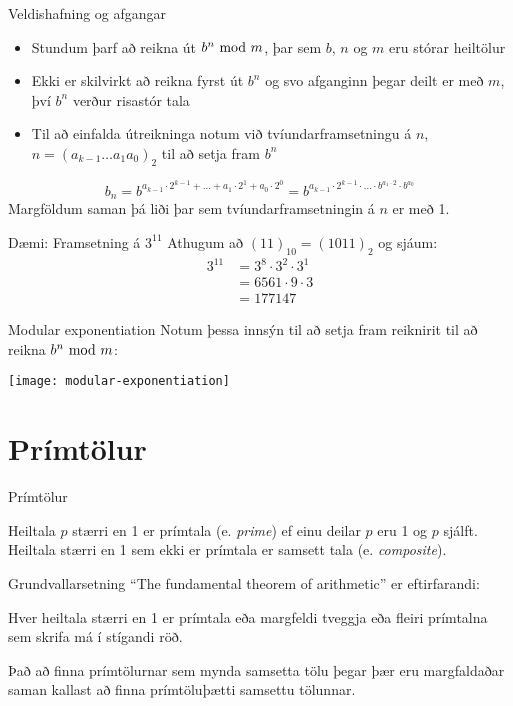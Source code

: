 \documentclass{beamer}
\begin{document}
\begin{frame}{Veldishafning og afgangar}
\begin{itemize}
 \item Stundum þarf að reikna út $b^n \ \text{mod}\ m$, þar sem $b$, $n$ og $m$ eru stórar heiltölur
 \item Ekki er skilvirkt að reikna fyrst út $b^n$ og svo afganginn þegar deilt er með $m$, því $b^n$ verður risastór tala
 \item Til að einfalda útreikninga notum við tvíundarframsetningu á $n$, $n = (a_{k-1}\ldots a_1 a_0)_2$ til að setja fram $b^n$
\end{itemize}
\[
 b_n = b^{a_{k-1}\cdot 2^{k-1} + \ldots + a_1\cdot 2^1 + a_0 \cdot 2^0} = b^{a_{k-1}\cdot2^{k-1}\cdot \ldots \cdot b^{a_1\cdot 2} \cdot b^{a_0}}
\]
Margföldum saman þá liði þar sem tvíundarframsetningin á $n$ er með 1.
\end{frame}

\begin{frame}{Dæmi: Framsetning á $3^{11}$}
Athugum að $(11)_{10} = (1011)_2$ og sjáum:
\begin{align*}
3^{11} &= 3^8\cdot 3^2 \cdot 3^1\\
&=6561 \cdot 9 \cdot 3\\
&=177147
\end{align*}

\end{frame}

\begin{frame}{Modular exponentiation}
Notum þessa innsýn til að setja fram reiknirit til að reikna $b^n \ \text{mod}\ m$:
\begin{center}
\texttt{[image: modular-exponentiation]}
\end{center}
\end{frame}

\section{Prímtölur}

\begin{frame}{Prímtölur}
\begin{tcolorbox}[title=Prímtölur]
Heiltala $p$ stærri en 1 er prímtala (e. \emph{prime}) ef einu deilar $p$ eru 1 og $p$ sjálft. Heiltala stærri en 1 sem ekki er prímtala er samsett tala (e. \emph{composite}).
\end{tcolorbox}
\end{frame}


\begin{frame}{Grundvallarsetning}
``The fundamental theorem of arithmetic'' er eftirfarandi:

\begin{tcolorbox}[title=Fundamental theorem of arithmetic]
Hver heiltala stærri en 1 er prímtala eða margfeldi tveggja eða fleiri prímtalna sem skrifa má í stígandi röð.
\end{tcolorbox}

Það að finna prímtölurnar sem mynda samsetta tölu þegar þær eru margfaldaðar saman kallast að finna prímtöluþætti samsettu tölunnar.
\end{frame}
\end{document}
